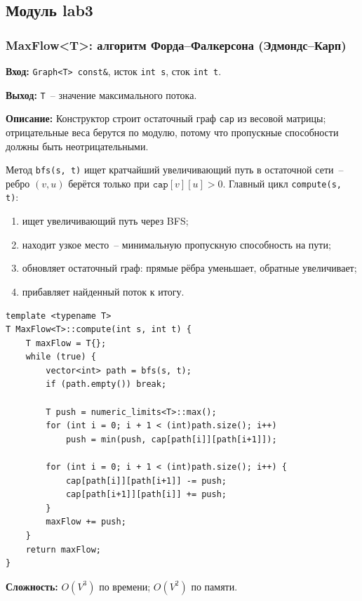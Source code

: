 \subsection{Модуль lab3}

\subsubsection{MaxFlow\textless T\textgreater: алгоритм Форда--Фалкерсона (Эдмондс--Карп)}

\textbf{Вход:} \texttt{Graph<T> const\&}, исток \texttt{int s},
сток \texttt{int t}.

\textbf{Выход:} \texttt{T}~-- значение максимального потока.

\textbf{Описание:} Конструктор строит остаточный граф \texttt{cap}
из весовой матрицы; отрицательные веса берутся по модулю, потому что
пропускные способности должны быть неотрицательными.

Метод \texttt{bfs(s, t)} ищет кратчайший увеличивающий путь в остаточной
сети~-- ребро $(v, u)$ берётся только при $\texttt{cap}[v][u] > 0$.
Главный цикл \texttt{compute(s, t)}:
\begin{enumerate}
    \item ищет увеличивающий путь через BFS;
    \item находит узкое место~-- минимальную пропускную способность на пути;
    \item обновляет остаточный граф: прямые рёбра уменьшает, обратные
          увеличивает;
    \item прибавляет найденный поток к итогу.
\end{enumerate}

\begin{lstlisting}[style=cstyle, caption={Алгоритм Эдмондса--Карпа (maxflow.cpp)}]
template <typename T>
T MaxFlow<T>::compute(int s, int t) {
    T maxFlow = T{};
    while (true) {
        vector<int> path = bfs(s, t);
        if (path.empty()) break;

        T push = numeric_limits<T>::max();
        for (int i = 0; i + 1 < (int)path.size(); i++)
            push = min(push, cap[path[i]][path[i+1]]);

        for (int i = 0; i + 1 < (int)path.size(); i++) {
            cap[path[i]][path[i+1]] -= push;
            cap[path[i+1]][path[i]] += push;
        }
        maxFlow += push;
    }
    return maxFlow;
}
\end{lstlisting}

\textbf{Сложность:} $O(V^3)$ по времени; $O(V^2)$ по памяти.

